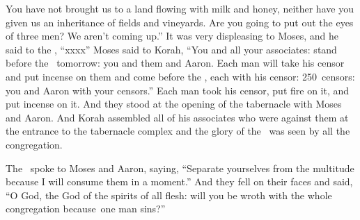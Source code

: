 \begin{inparaenum}
   You have not brought us to a land flowing with milk and honey, neither have you given us an inheritance of fields and vineyards. Are you going to put out the eyes of three men? We aren't coming up.''%
   It was very displeasing to Moses, and he said to the \lord, ``xxxx''%
   Moses said to Korah, ``You and all your associates: stand before the \lord\ tomorrow: you and them and Aaron.%
   Each man will take his censor and put incense on them and come before the \lord, each with his censor: 250~censors: you and Aaron with your censors.''%
   Each man took his censor, put fire on it, and put incense on it. And they stood at the opening of the tabernacle with Moses and Aaron.%
   And Korah assembled all of his associates who were against them at the entrance to the tabernacle complex and the glory of the \lord\ was seen by all the congregation.%

   The \lord\ spoke to Moses and Aaron, saying,%
   ``Separate yourselves from the multitude because I will consume them in a moment.''%
   And they fell on their faces and said, ``O God, the God of the spirits of all flesh: will you be wroth with the whole congregation because\understood{}\ one man sins?''%


\end{inparaenum}
